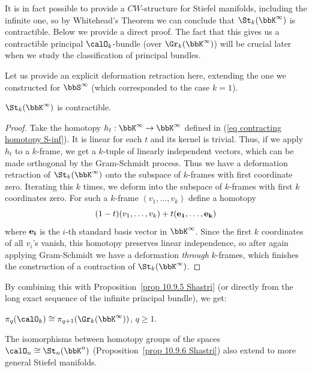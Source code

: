\begin{rem}
    It is in fact possible to provide a $CW$-structure for Stiefel manifolds, including the infinite one, so by Whitehead's Theorem we can conclude that $\St_k(\bbK^\infty)$ is contractible. Below we provide a direct proof. The fact that this gives us a contractible principal $\calO_k$-bundle (over $\Gr_k(\bbK^\infty)$) will be crucial later when we study the classification of principal bundles.
\end{rem}

Let us provide an explicit deformation retraction here, extending the one we constructed for $\bbS^\infty$ (which corresponded to the case $k=1$).
\begin{prop}
    $\St_k(\bbK^\infty)$ is contractible.
\end{prop}
\begin{proof}
    Take the homotopy $h_t:\bbK^\infty\to \bbK^\infty$ defined in (\ref{eq contracting homotopy S-inf}). It is linear for each $t$ and its kernel is trivial. Thus, if we apply $h_t$ to a $k$-frame, we get a $k$-tuple of linearly independent vectors, which can be made orthogonal by the Gram-Schmidt process. Thus we have a deformation retraction of $\St_k(\bbK^\infty)$ onto the subspace of $k$-frames with first coordinate zero. Iterating this $k$ times, we deform into the subspace of $k$-frames with first $k$ coordinates zero. For such a $k$-frame $(v_1,\ldots,v_k)$ define a homotopy
    \[(1-t)(v_1,\ldots,v_k)+t(\bf{e}_1,\ldots,\bf{e}_k)\]
    where $\bf{e}_i$ is the $i$-th standard basis vector in $\bbK^\infty$. Since the first $k$ coordinates of all $v_i$'s vanish, this homotopy preserves linear independence, so after again applying Gram-Schmidt we have a deformation \emph{through} $k$-frames, which finishes the construction of a contraction of $\St_k(\bbK^\infty)$.
\end{proof}
By combining this with Proposition~\ref{prop 10.9.5 Shastri} (or directly from the long exact sequence of the infinite principal bundle), we get:
\begin{cor}
   $\pi_q(\calO_k)\cong \pi_{q+1}(\Gr_k(\bbK^\infty))$, $q\geq 1$.
\end{cor}

The isomorphisms between homotopy groups of the spaces $\calO_n\cong \St_{n}(\bbK^n)$ (Proposition~\ref{prop 10.9.6 Shastri}) also extend to more general Stiefel manifolds. 

